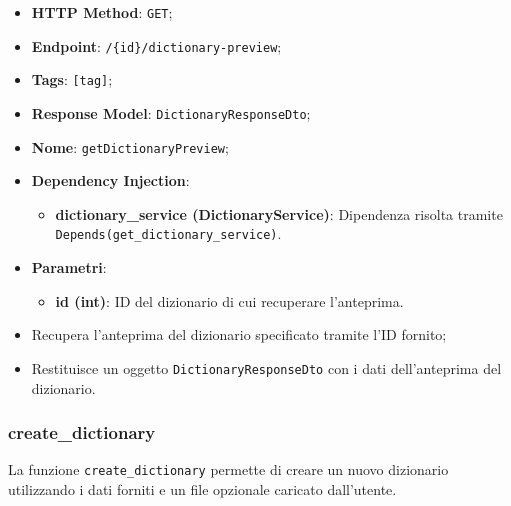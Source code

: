 \begin{itemize}
\item \textbf{HTTP Method}: \texttt{GET};
\item \textbf{Endpoint}: \texttt{/\{id\}/dictionary-preview};
\item \textbf{Tags}: \texttt{[tag]};
\item \textbf{Response Model}: \texttt{DictionaryResponseDto};
\item \textbf{Nome}: \texttt{getDictionaryPreview};
\item \textbf{Dependency Injection}:
\begin{itemize}
\item \textbf{dictionary\_service (DictionaryService)}: Dipendenza risolta tramite \texttt{Depends(get\_dictionary\_service)}.
\end{itemize}
\item \textbf{Parametri}:
\begin{itemize}
\item \textbf{id (int)}: ID del dizionario di cui recuperare l'anteprima.
\end{itemize}
\end{itemize}

\begin{itemize}
\item Recupera l'anteprima del dizionario specificato tramite l'ID fornito;
\item Restituisce un oggetto \texttt{DictionaryResponseDto} con i dati dell'anteprima del dizionario.
\end{itemize}

\subsubsection{create\_dictionary}

\par La funzione \texttt{create\_dictionary} permette di creare un nuovo dizionario utilizzando i dati forniti e un file opzionale caricato dall'utente.

